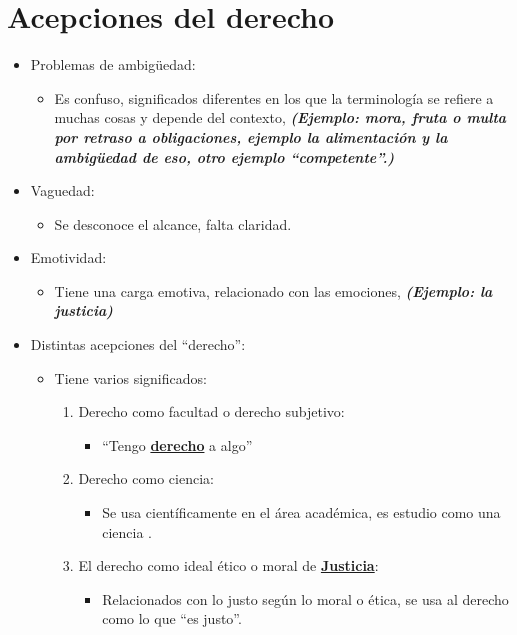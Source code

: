 \section{Acepciones del derecho}
\begin{itemize}
    \item Problemas de ambigüedad:
    \begin{itemize}
        \item Es confuso, significados diferentes en los que la terminología se refiere a muchas cosas y depende del contexto, \textbf{\emph{(Ejemplo: mora, fruta o multa por retraso a obligaciones, ejemplo la alimentación y la ambigüedad de eso, otro ejemplo ``competente''.)}}
    \end{itemize}

    
    \item Vaguedad:
    \begin{itemize}
        \item Se desconoce el alcance, falta claridad.
    \end{itemize}

    
    \item Emotividad: 
    \begin{itemize}
        \item Tiene una carga emotiva, relacionado con las emociones, \textbf{\emph{(Ejemplo: la justicia)}}
    \end{itemize}

    
    \item Distintas acepciones del ``derecho'':
    \begin{itemize}
        \item Tiene varios significados:
        \begin{enumerate}
            \item Derecho como facultad o derecho subjetivo:
            \begin{itemize}
                \item ``Tengo \underline{\textbf{derecho}} a algo''
            \end{itemize}
            
            \item Derecho como ciencia:
            \begin{itemize}
                \item Se usa científicamente en el área académica, es estudio como una ciencia .
            \end{itemize}
            
            \item El derecho como ideal ético o moral de \underline{\textbf{Justicia}}: 
            \begin{itemize}
                \item Relacionados con lo justo según lo moral o ética, se usa al derecho como lo que ``es justo''.
            \end{itemize}
            

\end{enumerate}
\end{itemize}
\end{itemize}
